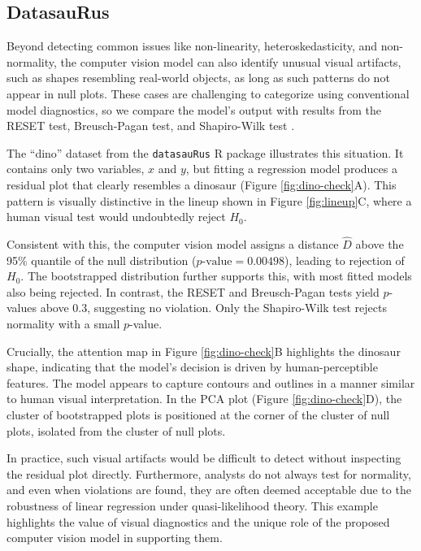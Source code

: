 \documentclass[]{interact}
\theoremstyle{plain}%
\theoremstyle{definition}
\theoremstyle{remark}
\begin{document}
\subsection{DatasauRus}\label{datasaurus}

Beyond detecting common issues like non-linearity, heteroskedasticity,
and non-normality, the computer vision model can also identify unusual
visual artifacts, such as shapes resembling real-world objects, as long
as such patterns do not appear in null plots. These cases are
challenging to categorize using conventional model diagnostics, so we
compare the model's output with results from the RESET test,
Breusch-Pagan test, and Shapiro-Wilk test \citep{shapiro1965analysis}.

The ``dino'' dataset from the \texttt{datasauRus} R package illustrates
this situation. It contains only two variables, \(x\) and \(y\), but
fitting a regression model produces a residual plot that clearly
resembles a dinosaur (Figure \ref{fig:dino-check}A). This pattern is
visually distinctive in the lineup shown in Figure \ref{fig:lineup}C,
where a human visual test would undoubtedly reject \(H_0\).

Consistent with this, the computer vision model assigns a distance
\(\hat{D}\) above the 95\% quantile of the null distribution
(\(p\text{-value} = 0.00498\)), leading to rejection of \(H_0\). The
bootstrapped distribution further supports this, with most fitted models
also being rejected. In contrast, the RESET and Breusch-Pagan tests
yield \(p\)-values above \(0.3\), suggesting no violation. Only the
Shapiro-Wilk test rejects normality with a small \(p\)-value.

Crucially, the attention map in Figure \ref{fig:dino-check}B highlights
the dinosaur shape, indicating that the model's decision is driven by
human-perceptible features. The model appears to capture contours and
outlines in a manner similar to human visual interpretation. In the PCA
plot (Figure \ref{fig:dino-check}D), the cluster of bootstrapped plots
is positioned at the corner of the cluster of null plots, isolated from
the cluster of null plots.

In practice, such visual artifacts would be difficult to detect without
inspecting the residual plot directly. Furthermore, analysts do not
always test for normality, and even when violations are found, they are
often deemed acceptable due to the robustness of linear regression under
quasi-likelihood theory. This example highlights the value of visual
diagnostics and the unique role of the proposed computer vision model in
supporting them.
\end{document}
